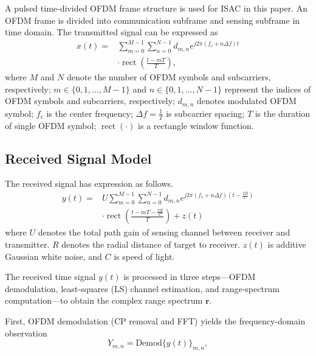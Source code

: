 \documentclass[sigconf]{acmart}
\begin{document}
A pulsed time-divided OFDM frame structure is used for ISAC in this paper. An OFDM frame is divided into communication subframe and sensing subframe in time domain. The transmitted signal can be expressed as
\begin{equation}
\begin{aligned}
x(t)= & \sum_{m=0}^{M-1} \sum_{n=0}^{N-1}
d_{m, n} e^{j 2 \pi\left(f_{c}+ n \Delta f\right) t} \\
& \cdot \operatorname{rect}\left(\frac{t-m T}{T}\right),
\end{aligned}
\end{equation}
where $M$ and $N$ denote the number of OFDM symbols and subcarriers, respectively; $m \in \{ 0,1,\ldots,M-1 \}$ and $n \in \{ 0,1,\ldots,N-1\}$ represent the indices of OFDM symbols and subcarriers, respectively; $d_{m, n}$ denotes modulated OFDM symbol; $f_c$ is the center frequency; $\Delta f=\frac{1}{T}$ is subcarrier spacing; $T$ is the duration of single OFDM symbol; $\operatorname{rect}\left(\cdot\right)$ is a rectangle window function.

\subsection{Received Signal Model}

The received signal has expression as follows.
\begin{equation}
\begin{aligned}
y(t)= & U \sum_{m=0}^{M-1} \sum_{n=0}^{N-1}
d_{m, n} e^{j 2 \pi\left(f_{c}+n \Delta f\right)\left(t-\frac{2 R}{C}\right)} \\
& \cdot \operatorname{rect}\left(\frac{t-m T-\frac{2 R}{C}}{T}\right)+z(t)
\end{aligned}
\end{equation}
where $U$ denotes the total path gain of sensing channel between receiver and transmitter. $R$ denotes the radial distance of target to receiver. $z(t)$ is additive Gaussian white noise, and $C$ is speed of light.

The received time signal $y(t)$ is processed in three steps---OFDM demodulation, least-squares (LS) channel estimation, and range-spectrum computation---to obtain the complex range spectrum $\mathbf{r}$.

First, OFDM demodulation (CP removal and FFT) yields the frequency-domain observation
\begin{equation}
Y_{m,n}=\mathrm{Demod}\{y(t)\}_{m,n},
\end{equation}
\end{document}
